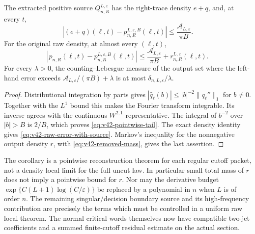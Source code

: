 \begin{corollary}
\label{cor:v42-pointwise-packet}
The extracted positive source $Q_{n,R}^{L,\varepsilon}$ has the
right-trace density $e+q$, and, at every $t$,
\begin{equation}\label{eq:v42-pointwise-tail}
 |(e+q)(\ell,t)-p^{L,\varepsilon,B}_{n,R}(\ell,t)|
              \le\frac{\mathcal A_{L,\varepsilon}}{\pi B}.
\end{equation}
For the original raw density, at almost every $(\ell,t)$,
\begin{equation}\label{eq:v42-raw-error-with-source}
 |p_{n,R}(\ell,t)-p^{L,\varepsilon,B}_{n,R}(\ell,t)|
      \le\frac{\mathcal A_{L,\varepsilon}}{\pi B}
                         +r_{n,R}^{L,\varepsilon}(\ell,t).
\end{equation}
For every $\lambda>0$, the counting--Lebesgue measure of the output set
where the left-hand error exceeds
$\mathcal A_{L,\varepsilon}/(\pi B)+\lambda$ is at most
$\delta_{n,L,\varepsilon}/\lambda$.
\end{corollary}
\begin{proof}
Distributional integration by parts gives
$|\widehat q_\ell(b)|\le |b|^{-2}\|q_\ell''\|_1$ for $b\ne0$.
Together with the $L^1$ bound this makes the Fourier transform
integrable. Its inverse agrees with the continuous $W^{2,1}$
representative. The integral of $b^{-2}$ over $|b|>B$ is $2/B$,
which proves \eqref{eq:v42-pointwise-tail}. The exact density
identity gives \eqref{eq:v42-raw-error-with-source}. Markov's
inequality for the nonnegative output density $r$, with
\eqref{eq:v42-removed-mass}, gives the last assertion.
\end{proof}

The corollary is a pointwise reconstruction theorem for each regular
cutoff packet, not a density local limit for the full uncut law. In
particular small total mass of $r$ does not imply a pointwise bound
for $r$. Nor may the derivative budget
$\exp\{C(L+1)\log(C/\varepsilon)\}$ be replaced by a polynomial in
$n$ when $L$ is of order $n$. The remaining singular/decision boundary
source and its high-frequency contribution are precisely the terms
which must be controlled in a uniform raw local theorem. The normal
critical words themselves now have compatible two-jet coefficients
and a summed finite-cutoff residual estimate on the actual section.
